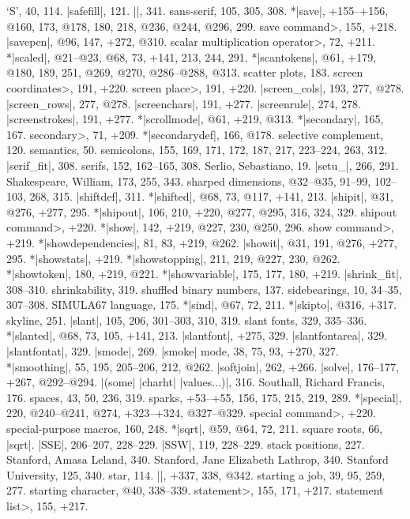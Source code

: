 `S', 40, 114.
|safefill|, 121.
|\sample|, 341.
sans-serif, 105, 305, 308.
*|save|, +155--+156, @160, 173, @178, 180, 218, @236, @244, @296, 299.
\<save command>, 155, +218.
|savepen|, @96, 147, +272, @310.
\<scalar multiplication operator>, 72, +211.
*|scaled|, @21--@23, @68, 73, +141, 213, 244, 291.
*|scantokens|, @61, +179, @180, 189, 251, @269, @270, @286--@288, @313.
scatter plots, 183.
\<screen coordinates>, 191, +220.
\<screen place>, 191, +220.
|screen_cols|, 193, 277, @278.
|screen_rows|, 277, @278.
|screenchars|, 191, +277.
|screenrule|, 274, 278.
|screenstrokes|, 191, +277.
*|scrollmode|, @61, +219, @313.
*|secondary|, 165, 167.
\<secondary>, 71, +209.
*|secondarydef|, 166, @178.
selective complement, 120.
semantics, 50.
semicolons, 155, 169, 171, 172, 187, 217, 223--224, 263, 312.
|serif_fit|, 308.
serifs, 152, 162--165, 308.
Serlio, Sebastiano, 19.
|setu_|, 266, 291.
Shakespeare, William, 173, 255, 343.
sharped dimensions, @32--@35, 91--99, 102--103, 268, 315.
|shiftdef|, 311.
*|shifted|, @68, 73, @117, +141, 213.
|shipit|, @31, @276, +277, 295.
*|shipout|, 106, 210, +220, @277, @295, 316, 324, 329.
\<shipout command>, +220.
*|show|, 142, +219, @227, 230, @250, 296.
\<show command>, +219.
*|showdependencies|, 81, 83, +219, @262.
|showit|, @31, 191, @276, +277, 295.
*|showstats|, +219.
*|showstopping|, 211, 219, @227, 230, @262.
*|showtoken|, 180, +219, @221.
*|showvariable|, 175, 177, 180, +219.
|shrink_fit|, 308--310.
shrinkability, 319.
shuffled binary numbers, 137.
sidebearings, 10, 34--35, 307--308.
{\sevenrm SIMULA67} language, 175.
*|sind|, @67, 72, 211.
*|skipto|, @316, +317.
skyline, 251.
|slant|, 105, 206, 301--303, 310, 319.
slant fonts, 329, 335--336.
*|slanted|, @68, 73, 105, +141, 213.
|slantfont|, +275, 329.
|slantfontarea|, 329.
|slantfontat|, 329.
|smode|, 269.
|smoke| mode, 38, 75, 93, +270, 327.
*|smoothing|, 55, 195, 205--206, 212, @262.
|softjoin|, 262, +266.
|solve|, 176--177, +267, @292--@294.
|(some| |charht| |values...)|, 316.
Southall, Richard Francis, 176.
spaces, 43, 50, 236, 319.
sparks, +53--+55, 156, 175, 215, 219, 289.
*|special|, 220, @240--@241, @274, +323--+324, @327--@329.
\<special command>, +220.
special-purpose macros, 160, 248.
*|sqrt|, @59, @64, 72, 211.
square roots, 66, \also |sqrt|.
|SSE|, 206--207, 228--229.
|SSW|, 119, 228--229.
stack positions, 227.
Stanford, Amasa Leland, 340.
Stanford, Jane Elizabeth Lathrop, 340.
Stanford University, 125, 340.
star, 114.
|\startfont|, +337, 338, @342.
starting a job, 39, 95, 259, 277.
starting character, @40, 338--339.
\<statement>, 155, 171, +217.
\<statement list>, 155, +217.
